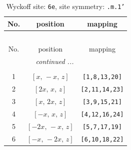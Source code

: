 \documentclass[fleqn,8pt]{jsarticle}
\begin{document}
\renewcommand{\arraystretch}{1.2}
\begin{longtable}{ccc}
\caption{Wyckoff site: {\tt 6e}, site symmetry: {\tt .m.1'}}
 \\
 \hline \hline
No. & position & mapping \\ \hline \endfirsthead

\multicolumn{2}{l}{\tablename\ \thetable{}} \\
 \hline \hline
No. & position & mapping \\ \hline \endhead

 \hline \hline
\multicolumn{2}{r}{\footnotesize\it continued ...} \\ \endfoot

 \hline \hline
\multicolumn{2}{r}{} \\ \endlastfoot

1 & $\left[ x,\, - x,\, z \right]$ & {\tt [1,8,13,20]} \\ \hline
2 & $\left[ 2 x,\, x,\, z \right]$ & {\tt [2,11,14,23]} \\ \hline
3 & $\left[ x,\, 2 x,\, z \right]$ & {\tt [3,9,15,21]} \\ \hline
4 & $\left[ - x,\, x,\, z \right]$ & {\tt [4,12,16,24]} \\ \hline
5 & $\left[ - 2 x,\, - x,\, z \right]$ & {\tt [5,7,17,19]} \\ \hline
6 & $\left[ - x,\, - 2 x,\, z \right]$ & {\tt [6,10,18,22]} \\
\end{longtable}
\renewcommand{\arraystretch}{1.2}
\end{document}
